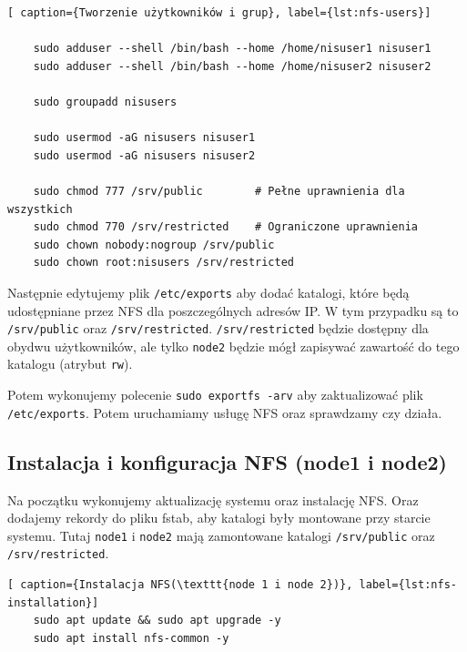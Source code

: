 \begin{lstlisting}[ caption={Tworzenie użytkowników i grup}, label={lst:nfs-users}]

	sudo adduser --shell /bin/bash --home /home/nisuser1 nisuser1
	sudo adduser --shell /bin/bash --home /home/nisuser2 nisuser2
	
	sudo groupadd nisusers
	
	sudo usermod -aG nisusers nisuser1  
	sudo usermod -aG nisusers nisuser2 
	
	sudo chmod 777 /srv/public        # Pełne uprawnienia dla wszystkich
	sudo chmod 770 /srv/restricted    # Ograniczone uprawnienia
	sudo chown nobody:nogroup /srv/public
	sudo chown root:nisusers /srv/restricted 
	\end{lstlisting}
\clearpage
Następnie edytujemy plik \texttt{/etc/exports} aby dodać katalogi, które będą udostępniane przez NFS dla poszczególnych adresów IP. W tym przypadku są to \texttt{/srv/public} oraz \texttt{/srv/restricted}. \texttt{/srv/restricted} będzie dostępny dla obydwu użytkowników, ale tylko \texttt{node2} będzie mógł zapisywać zawartość do tego katalogu (atrybut \texttt{rw}).\\

Potem wykonujemy polecenie \texttt{sudo exportfs -arv} aby zaktualizować plik \texttt{/etc/exports}. Potem uruchamiamy usługę NFS oraz sprawdzamy czy działa.\\

\clearpage
{}

\clearpage
\subsection{Instalacja i konfiguracja NFS (node1 i node2)}
\label{sec:nfs-installation-node}

Na początku wykonujemy aktualizację systemu oraz instalację NFS. Oraz dodajemy rekordy do pliku fstab, aby katalogi były montowane przy starcie systemu. Tutaj \texttt{node1} i \texttt{node2} mają zamontowane katalogi \texttt{/srv/public} oraz \texttt{/srv/restricted}.\\
\vspace{-0.8cm}
\begin{lstlisting}[ caption={Instalacja NFS(\texttt{node 1 i node 2})}, label={lst:nfs-installation}]
	sudo apt update && sudo apt upgrade -y
	sudo apt install nfs-common -y
	\end{lstlisting}
	\vspace{-0.8cm}

